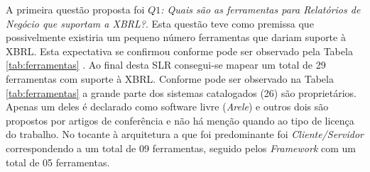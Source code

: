 \documentclass[12pt]{article}
\begin{document}
A primeira questão proposta foi \textit{$Q1$: Quais são as ferramentas para
  Relatórios de Negócio que suportam a XBRL?}. Esta questão teve como premissa
que possivelmente existiria um pequeno número ferramentas que dariam suporte à
XBRL. Esta expectativa se confirmou conforme pode ser observado pela Tabela \ref{tab:ferramentas}
. Ao final desta SLR consegui-se mapear um total de 29 ferramentas com suporte à
XBRL. Conforme pode ser observado na Tabela \ref{tab:ferramentas} a grande
parte dos sistemas catalogados (26) são proprietários. Apenas um deles é
declarado como software livre (\textit{Arele}) e outros dois são propostos por
artigos de conferência e não há menção quando ao tipo de licença do
trabalho. No tocante à arquitetura a que foi predominante foi
\textit{Cliente/Servidor} correspondendo a um total de 09 ferramentas, seguido
pelos \textit{Framework} com um total de 05 ferramentas.
\end{document}
